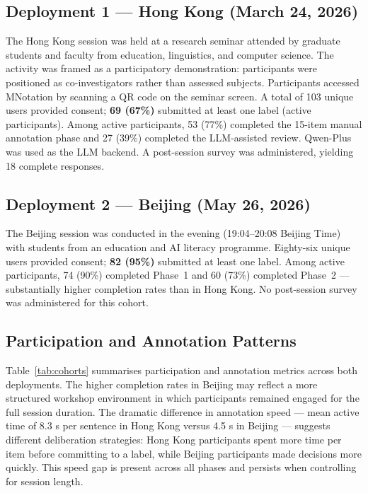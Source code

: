 \documentclass[fleqn,10pt]{JLA_article}
\begin{document}
\subsection{Deployment 1 — Hong Kong (March 24, 2026)}

The Hong Kong session was held at a research seminar attended by graduate students and
faculty from education, linguistics, and computer science. The activity was framed as a
participatory demonstration: participants were positioned as co-investigators rather than
assessed subjects. Participants accessed MNotation by scanning a QR code on the seminar
screen. A total of 103 unique users provided consent; \textbf{69 (67\%)} submitted at
least one label (active participants). Among active participants, 53 (77\%) completed the
15-item manual annotation phase and 27 (39\%) completed the LLM-assisted review.
Qwen-Plus was used as the LLM backend. A post-session survey was administered, yielding
18 complete responses.

\subsection{Deployment 2 — Beijing (May 26, 2026)}

The Beijing session was conducted in the evening (19:04--20:08 Beijing Time) with students
from an education and AI literacy programme. Eighty-six unique users provided consent;
\textbf{82 (95\%)} submitted at least one label. Among active participants, 74 (90\%)
completed Phase~1 and 60 (73\%) completed Phase~2 — substantially higher completion rates
than in Hong Kong. No post-session survey was administered for this cohort.

\subsection{Participation and Annotation Patterns}

Table~\ref{tab:cohorts} summarises participation and annotation metrics across both
deployments. The higher completion rates in Beijing may reflect a more structured
workshop environment in which participants remained engaged for the full session duration.
The dramatic difference in annotation speed — mean active time of 8.3 s per sentence in
Hong Kong versus 4.5 s in Beijing — suggests different deliberation strategies: Hong Kong
participants spent more time per item before committing to a label, while Beijing
participants made decisions more quickly. This speed gap is present across all phases
and persists when controlling for session length.
\end{document}
